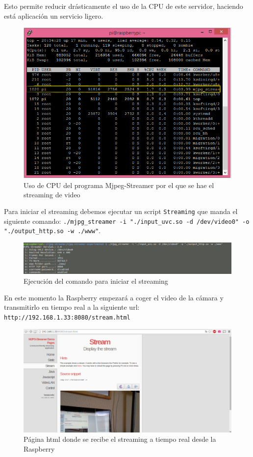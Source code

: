 \documentclass[twoside, 11pt]{epstfg}
\begin{document}
Esto permite reducir drásticamente el uso de la CPU de este servidor, haciendo está aplicación un servicio ligero.


\begin{figure}[h!]
	\centerline{
		\mbox{\includegraphics[width=.80\textwidth]{images/UsoCPUMjpeg.png}}
	}
	\caption{Uso de CPU del programa Mjpeg-Streamer por el que se hae el streaming de video}
\end{figure}


Para iniciar el streaming debemos ejecutar un script \texttt{Streaming} que manda el siguiente comando: \texttt{./mjpg\_streamer -i "./input\_uvc.so -d /dev/video0" -o "./output\_http.so -w ./www"}.



\begin{figure}[h!]
	\centerline{
		\mbox{\includegraphics[width=.80\textwidth]{images/Streamingcomando.png}}
	}
	\caption{Ejecución del comando para iniciar el streaming}
\end{figure}

En este momento la Raspberry empezará a coger el video de la cámara y transmitirlo en tiempo real a la siguiente url: \texttt{http://192.168.1.33:8080/stream.html}

\begin{figure}[h!]
	\centerline{
		\mbox{\includegraphics[width=.80\textwidth]{images/pagStream.png}}
	}
	\caption{Página html donde se recibe el streaming a tiempo real desde la Raspberry }
\end{figure}
\end{document}
